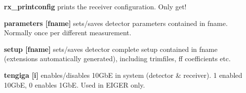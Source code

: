 \begin{DoxyItemize}
\item {\bfseries rx\_\-printconfig} prints the receiver configuration. Only get!
\end{DoxyItemize}


\begin{DoxyItemize}
\item {\bfseries parameters \mbox{[}fname\mbox{]}} sets/saves detector parameters contained in fname. Normally once per different measurement.
\end{DoxyItemize}


\begin{DoxyItemize}
\item {\bfseries setup \mbox{[}fname\mbox{]}} sets/saves detector complete setup contained in fname (extensions automatically generated), including trimfiles, ff coefficients etc.
\end{DoxyItemize}


\begin{DoxyItemize}
\item {\bfseries tengiga \mbox{[}i\mbox{]}} enables/disables 10GbE in system (detector \& receiver). 1 enabled 10GbE, 0 enables 1GbE. Used in EIGER only. 
\end{DoxyItemize}